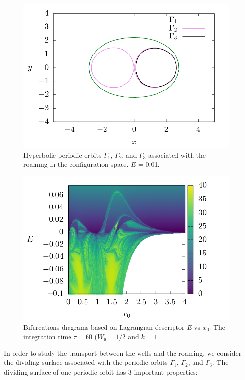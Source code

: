 \documentclass[10pt,aps,onecolumn,superscriptaddress]{revtex4-2}
\begin{document}
\begin{figure}[htbp]
	\includegraphics[scale=0.5]{orbits_2D.png}
	\caption{ Hyperbolic periodic orbits $\Gamma_1$, $\Gamma_2$, and $\Gamma_3$ associated with the roaming in the configuration space. $E$ = 0.01. }
	\label{fig:periodic_orbits_roaming}
\end{figure}




\begin{figure}[htbp]
	\includegraphics[scale=0.5]{ld_t60_line_x_E.png}
	\caption{Bifurcations diagrams based on Lagrangian descriptor $E$ vs $x_0$. The integration time $\tau=60$ ($W_0 = 1/2$ and $k = 1$.}
	\label{fig:ld_E_xy}
\end{figure}


In order to study the transport between the wells and the roaming, we consider the dividing surface associated with the periodic orbits $\Gamma_1$, $\Gamma_2$, and $\Gamma_3$. The dividing surface of one periodic orbit has 3 important properties:
\end{document}
